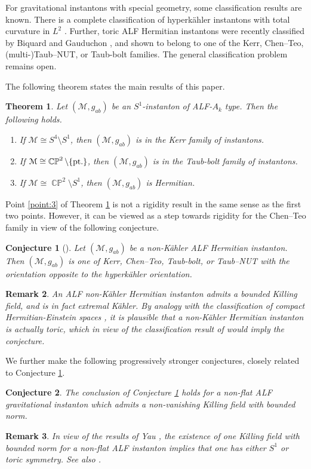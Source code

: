 \documentclass[a4paper,11pt,reqno]{amsart}
\newcommand{\cM}{\mathcal{M}}
\theoremstyle{plain}
\newtheorem{thm}{Theorem}[section]
\newtheorem{conj}{Conjecture}
\newtheorem{remark}[thm]{Remark}
\DeclareMathOperator{\CP}{\mathbb{C}\mathbb{P}}
\numberwithin{equation}{section}
\begin{document}
For gravitational instantons with special geometry, some  classification results  are known. There is a  complete classification of  hyperk\"ahler instantons with total curvature in $L^2$ \cite{chen2015gravitational,chen2019gravitational,chen2021gravitational,2021arXiv210812991S}. Further, toric ALF Hermitian instantons were recently classified by Biquard and Gauduchon \cite{Biquard:Gauduchon}, and shown to belong to one of the Kerr, Chen--Teo, (multi-)Taub--NUT, or Taub-bolt families. 
The general classification problem remains open. 

The following theorem states the main results of this paper.
\begin{thm}\label{thm:main-intro} Let $(\cM, g_{ab})$ be an $S^1$-instanton of ALF-$A_k$ type. Then the following holds. 
\begin{enumerate} 
\item \label{point:Kerr} 
%
If $\cM \cong S^4 \setminus S^1$, then $(\cM, g_{ab})$ is in the Kerr family of instantons.
\item \label{point:T-b} 
%
If $\cM \cong \CP^2 \setminus \{\text{\rm pt.}\}$, then $(\cM, g_{ab})$ is in the Taub-bolt family of instantons.
\item \label{point:3} 
%
If $\cM \cong \CP^2 \setminus S^1$, then $(\cM, g_{ab})$ is Hermitian. 
\end{enumerate} 
\end{thm} 
Point \ref{point:3} of Theorem \ref{thm:main-intro} is not a rigidity result in the same sense as the first two points. However, it can be viewed as a step towards rigidity for the Chen--Teo family in view of the following conjecture.   

\begin{conj}[] \label{conj:Herm-class} Let $(\cM, g_{ab})$ be a non-K\"ahler ALF  Hermitian instanton. Then $(\cM, g_{ab})$ is one of Kerr, Chen--Teo, Taub-bolt, or Taub--NUT with the orientation opposite to the hyperk\"ahler orientation. 
\end{conj} 
\begin{remark} 
An ALF 
%
non-K\"ahler Hermitian instanton admits a bounded Killing field, and is in fact extremal K\"ahler. By analogy with the classification of compact Hermitian-Einstein spaces \cite{MR2899877},  it is plausible that a non-K\"ahler Hermitian instanton is actually toric, which in view of the classification result of \cite{Biquard:Gauduchon} would imply the conjecture.  
\end{remark} 
We further make the following progressively stronger conjectures, closely related to Conjecture \ref{conj:Herm-class}. 
\begin{conj} \label{conj:KVF-class} The conclusion of Conjecture \ref{conj:Herm-class} holds for a non-flat ALF gravitational instanton which 
admits a non-vanishing Killing field with bounded norm.  
%
\end{conj}
\begin{remark} 
In view of the results of  Yau \cite{MR448379}, the existence of one Killing field with bounded norm for a non-flat ALF instanton implies that one has either  $S^1$ or toric symmetry. See also \cite[\S 2]{gibbons:hawking:1979}. 
\end{remark}
\end{document}
